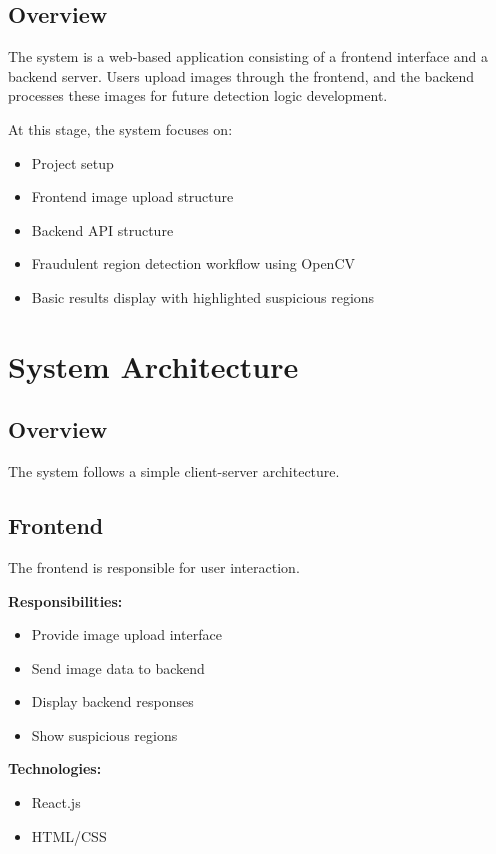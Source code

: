 \documentclass[12pt]{article}
\begin{document}
\subsection{Overview}

The system is a web-based application consisting of a frontend interface and a backend server. Users upload images through the frontend, and the backend processes these images for future detection logic development.

At this stage, the system focuses on:
\begin{itemize}[noitemsep]
    \item Project setup
    \item Frontend image upload structure
    \item Backend API structure
    \item Fraudulent region detection workflow using OpenCV
    \item Basic results display with highlighted suspicious regions
\end{itemize}

\section{System Architecture}

\subsection{Overview}

The system follows a simple client-server architecture.

\subsection{Frontend}

The frontend is responsible for user interaction.

\textbf{Responsibilities:}
\begin{itemize}[noitemsep]
    \item Provide image upload interface
    \item Send image data to backend
    \item Display backend responses
    \item Show suspicious regions
\end{itemize}

\textbf{Technologies:}
\begin{itemize}[noitemsep]
    \item React.js
    \item HTML/CSS
\end{itemize}
\end{document}
